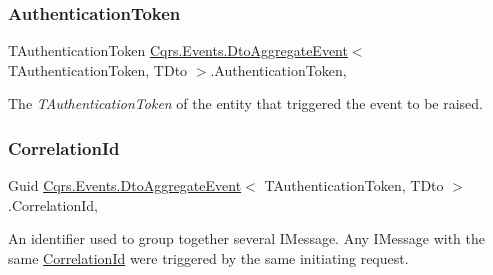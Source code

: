 \subsubsection{\texorpdfstring{Authentication\+Token}{AuthenticationToken}}
{\footnotesize\ttfamily T\+Authentication\+Token \hyperlink{classCqrs_1_1Events_1_1DtoAggregateEvent}{Cqrs.\+Events.\+Dto\+Aggregate\+Event}$<$ T\+Authentication\+Token, T\+Dto $>$.Authentication\+Token\hspace{0.3cm}{\ttfamily [get]}, {\ttfamily [set]}}



The {\itshape T\+Authentication\+Token}  of the entity that triggered the event to be raised. 

\mbox{\label{classCqrs_1_1Events_1_1DtoAggregateEvent_a0736560199765e66c50963dfa767b5a5_a0736560199765e66c50963dfa767b5a5}} 
\subsubsection{\texorpdfstring{Correlation\+Id}{CorrelationId}}
{\footnotesize\ttfamily Guid \hyperlink{classCqrs_1_1Events_1_1DtoAggregateEvent}{Cqrs.\+Events.\+Dto\+Aggregate\+Event}$<$ T\+Authentication\+Token, T\+Dto $>$.Correlation\+Id\hspace{0.3cm}{\ttfamily [get]}, {\ttfamily [set]}}



An identifier used to group together several I\+Message. Any I\+Message with the same \hyperlink{classCqrs_1_1Events_1_1DtoAggregateEvent_a0736560199765e66c50963dfa767b5a5_a0736560199765e66c50963dfa767b5a5}{Correlation\+Id} were triggered by the same initiating request. 

\mbox{\label{classCqrs_1_1Events_1_1DtoAggregateEvent_a58aae5cf252106008695c50ffe994517_a58aae5cf252106008695c50ffe994517}} 
